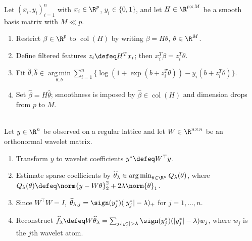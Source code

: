 \begin{method} \label{meth:sl-spline-filtered-logistic-features} \\
Let $(x_i,y_i)_{i=1}^n$ with $x_i\in\R^p$, $y_i\in\{0,1\}$, and let $H\in\R^{p\times M}$ be a smooth basis matrix with $M\ll p$.
\begin{enumerate}[label=(\roman*)]
\setlength{\itemsep}{0pt}
\item Restrict $\beta\in\R^p$ to $\operatorname{col}(H)$ by writing $\beta=H\theta$, $\theta\in\R^M$.
\item Define filtered features $z_i\defeq H^Tx_i$; then $x_i^T\beta=z_i^T\theta$.
\item Fit $\widehat{\theta},\widehat{b}\in\operatorname*{arg\,min}\limits_{\theta,b}\sum\limits_{i=1}^n\{\log(1+\exp(b+z_i^T\theta))-y_i(b+z_i^T\theta)\}$.
\item Set $\widehat{\beta}=H\widehat{\theta}$; smoothness is imposed by $\widehat{\beta}\in\operatorname{col}(H)$ and dimension drops from $p$ to $M$.
\end{enumerate}
\end{method}

\begin{method} \label{meth:sl-wavelet-shrinkage} \\
Let $y\in\R^n$ be observed on a regular lattice and let $W\in\R^{n\times n}$ be an orthonormal wavelet matrix.
\begin{enumerate}[label=(\roman*)]
\setlength{\itemsep}{0pt}
\item Transform $y$ to wavelet coefficients $y^\ast\defeq W^\top y$.
\item Estimate sparse coefficients by $\widehat{\theta}_\lambda\in\operatorname*{arg\,min}_{\theta\in\R^n}Q_\lambda(\theta)$, where $Q_\lambda(\theta)\defeq\norm{y-W\theta}_2^2+2\lambda\norm{\theta}_1$.
\item Since $W^\top W=I$, $\widehat{\theta}_{\lambda,j}=\sign(y^\ast_j)(|y^\ast_j|-\lambda)_+$ for $j=1,\ldots,n$.
\item Reconstruct $\widehat{f}_\lambda\defeq W\widehat{\theta}_\lambda=\sum_{j:|y^\ast_j|>\lambda}\sign(y^\ast_j)(|y^\ast_j|-\lambda)w_j$, where $w_j$ is the $j$th wavelet atom.
\end{enumerate}
\end{method}

